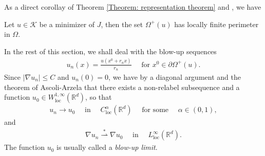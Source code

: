 \documentclass[11pt,reqno]{amsart}
\begin{document}
As a direct corollay of Theorem \ref{Theorem: representation theorem} and \cite[Theorem 1, Section 5.11]{E2015}, we have
\begin{corollary}\label{Corollary: Finite perimeter of the positive phase}
	Let $u\in\mathcal{K}$ be a minimizer of $J$, then the set $\varOmega^{+}(u)$ has locally finite perimeter in $\Omega$.
\end{corollary}
In the rest of this section, we shall deal with the blow-up sequences
\begin{align*}
	u_{n}(x)=\frac{u(x^{0}+r_{n}x)}{r_{n}}\quad\text{  for }x^{0}\in\partial\varOmega^{+}(u).
\end{align*}
Since $|\nabla u_{n}|\leqslant C$ and $u_{n}(0)=0$, we have by a diagonal argument and the theorem of Ascoli-Arzela that there exists a non-relabel subsequence and a function $u_{0}\in W^{1,\infty}_{\mathrm{loc}}(\mathbb{R}^{d})$, so that
\begin{align}\label{Formula: W(11)}
	u_{n}\to u_{0}\quad\text{ in }\quad C_{\mathrm{loc}}^{\alpha}(\mathbb{R}^{d})\quad\text{ for some }\quad\alpha\in(0,1),
\end{align}
and
\begin{align}\label{Formula: W(12)}
	\nabla u_{n}\stackrel{*}{\rightharpoonup}\nabla u_{0}\quad\text{ in }\quad L_{\mathrm{loc}}^{\infty}(\mathbb{R}^{d}).
\end{align}
The function $u_{0}$ is usually called a \emph{blow-up limit}.
\end{document}
